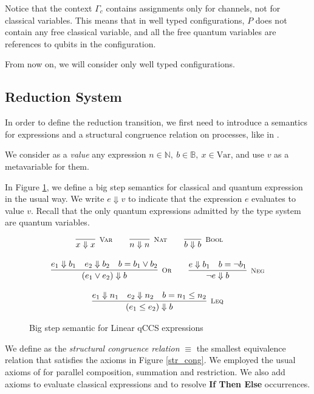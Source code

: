 Notice that the context $\Gamma_c$ contains assignments only for channels, not for classical variables. This means that in well typed configurations, $P$ does not contain any free classical variable, and all the free quantum variables are references to qubits in the configuration.

From now on, we will consider only well typed configurations.

\subsection{Reduction System}
In order to define the reduction transition, we first need to introduce a semantics for expressions and a structural congruence relation on processes, like in \cite{gayCommunicatingQuantumProcesses2005}.

We consider as a \textit{value} any expression $n \in \mathbb{N},\  b \in \mathbb{B},\  x \in  \text{Var}$, and use $v$ as a metavariable for them.

In Figure \ref{big_step_exp}, we define a big step semantics for classical and quantum expression in the usual way. We write $e \Downarrow v$ to indicate that the expression $e$ evaluates to value $v$. Recall that the only quantum expressions admitted by the type system are quantum variables.

\begin{figure}[h!]
\begin{gather*}
\infer[\mbox{\footnotesize\scshape Var}]{x \Downarrow x}{} \qquad
    \infer[\mbox{\footnotesize\scshape Nat}]{n \Downarrow n}{} \qquad
    \infer[\mbox{\footnotesize\scshape Bool}]{b \Downarrow b}{}  \qquad
\\[0.3cm]
    \infer[\mbox{\footnotesize\scshape Or}]{(e_1 \lor e_2) \Downarrow b}{e_1 \Downarrow b_1 & e_2 \Downarrow b_2 & b = b_1 \lor b_2} \qquad
    \infer[\mbox{\footnotesize\scshape Neg}]{\neg e \Downarrow b}{e \Downarrow b_1 & b = \neg b_1} \\[0.3cm]
    \infer[\mbox{\footnotesize\scshape Leq}]{(e_1 \leq e_2) \Downarrow b}{e_1 \Downarrow n_1 & e_2 \Downarrow n_2 & b = n_1 \leq n_2}
\end{gather*}
\caption{Big step semantic for Linear qCCS expressions}
\label{big_step_exp}
\end{figure}

We define as the \textit{structural congruence relation} $\equiv$ the smallest equivalence relation that satisfies the axioms in Figure \ref{str_cong}. We employed the usual axioms of \cite{milnerFunctionsProcesses1990} for parallel composition, summation and restriction. We also add axioms to evaluate classical expressions and to resolve \textbf{If Then Else} occurrences.


